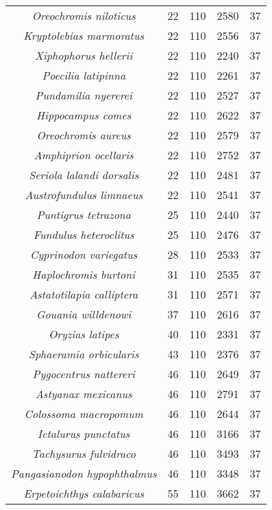 \begin{longtable}[c]{|c|c|c|c|c|}
\textit{Oreochromis niloticus}         & 22  & 110 & 2580 & 37 \\
\textit{Kryptolebias marmoratus}       & 22  & 110 & 2556 & 37 \\
\textit{Xiphophorus hellerii}          & 22  & 110 & 2240 & 37 \\
\textit{Poecilia latipinna}            & 22  & 110 & 2261 & 37 \\
\textit{Pundamilia nyererei}           & 22  & 110 & 2527 & 37 \\
\textit{Hippocampus comes}             & 22  & 110 & 2622 & 37 \\
\textit{Oreochromis aureus}            & 22  & 110 & 2579 & 37 \\
\textit{Amphiprion ocellaris}          & 22  & 110 & 2752 & 37 \\
\textit{Seriola lalandi dorsalis}      & 22  & 110 & 2481 & 37 \\
\textit{Austrofundulus limnaeus}       & 22  & 110 & 2541 & 37 \\
\textit{Puntigrus tetrazona}           & 25  & 110 & 2440 & 37 \\
\textit{Fundulus heteroclitus}         & 25  & 110 & 2476 & 37 \\
\textit{Cyprinodon variegatus}         & 28  & 110 & 2533 & 37 \\
\textit{Haplochromis burtoni}          & 31  & 110 & 2535 & 37 \\
\textit{Astatotilapia calliptera}      & 31  & 110 & 2571 & 37 \\
\textit{Gouania willdenowi}            & 37  & 110 & 2616 & 37 \\
\textit{Oryzias latipes}               & 40  & 110 & 2331 & 37 \\
\textit{Sphaeramia orbicularis}        & 43  & 110 & 2376 & 37 \\
\textit{Pygocentrus nattereri}         & 46  & 110 & 2649 & 37 \\
\textit{Astyanax mexicanus}            & 46  & 110 & 2791 & 37 \\
\textit{Colossoma macropomum}          & 46  & 110 & 2644 & 37 \\
\textit{Ictalurus punctatus}           & 46  & 110 & 3166 & 37 \\
\textit{Tachysurus fulvidraco}         & 46  & 110 & 3493 & 37 \\
\textit{Pangasianodon hypophthalmus}   & 46  & 110 & 3348 & 37 \\
\textit{Erpetoichthys calabaricus}     & 55  & 110 & 3662 & 37 \\

\end{longtable}
